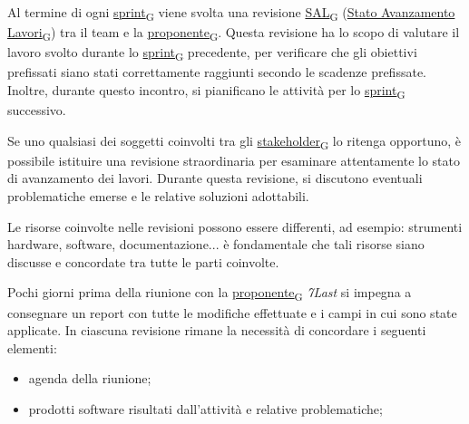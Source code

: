 Al termine di ogni \href{https://7last.github.io/docs/rtb/documentazione-interna/glossario\#sprint}{sprint\textsubscript{G}} viene svolta una revisione \href{https://7last.github.io/docs/rtb/documentazione-interna/glossario\#stato-avanzamento-lavori}{SAL\textsubscript{G}}
(\href{https://7last.github.io/docs/rtb/documentazione-interna/glossario\#stato-avanzamento-lavori}{Stato Avanzamento Lavori\textsubscript{G}}) tra il team e la \href{https://7last.github.io/docs/rtb/documentazione-interna/glossario\#proponente}{proponente\textsubscript{G}}. Questa revisione ha lo scopo di valutare il lavoro svolto durante lo \href{https://7last.github.io/docs/rtb/documentazione-interna/glossario\#sprint}{sprint\textsubscript{G}} precedente, per verificare che gli obiettivi prefissati siano stati correttamente raggiunti secondo le scadenze prefissate.
Inoltre, durante questo incontro, si pianificano le attività per lo \href{https://7last.github.io/docs/rtb/documentazione-interna/glossario\#sprint}{sprint\textsubscript{G}} successivo.

Se uno qualsiasi dei soggetti coinvolti tra gli \href{https://7last.github.io/docs/rtb/documentazione-interna/glossario\#stakeholder}{stakeholder\textsubscript{G}} lo ritenga opportuno, è possibile istituire una revisione straordinaria per esaminare attentamente lo stato di avanzamento dei lavori. Durante questa revisione, si discutono eventuali problematiche emerse e le relative soluzioni adottabili.

Le risorse coinvolte nelle revisioni possono essere differenti, ad esempio: strumenti hardware, software, documentazione... è fondamentale che tali risorse siano discusse e concordate tra tutte le parti coinvolte.

Pochi giorni prima della riunione con la \href{https://7last.github.io/docs/rtb/documentazione-interna/glossario\#proponente}{proponente\textsubscript{G}} \textit{7Last} si impegna a consegnare un report con tutte le modifiche effettuate e i campi in cui sono state applicate.
In ciascuna revisione rimane la necessità di concordare i seguenti elementi:
\begin{itemize}
	\item agenda della riunione;
	\item prodotti software risultati dall'attività e relative problematiche;
\end{itemize}

